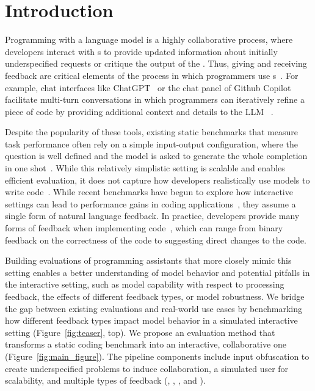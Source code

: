 

\section{Introduction}







Programming with a language model is a highly collaborative process, where developers interact with \cm s to provide updated information about initially underspecified requests or critique the output of the \cm.
Thus, giving and receiving feedback are critical elements of the process in which programmers use \cm{}s~\cite{chidambaram2024socratic}. 
For example, chat interfaces like ChatGPT~\citep{chatgpt} or the chat panel of Github Copilot~\cite{copilot} facilitate multi-turn conversations in which programmers can iteratively refine a piece of code by providing additional context and details to the LLM ~\citep{kalla2023study,xiao2023devgpt}.

Despite the popularity of these tools, existing static benchmarks that measure task performance often rely on a simple input-output configuration, where the question is well defined and the model is asked to generate the whole completion in one shot~\citep{chen2021evaluating,austin2021program,jain2024livecodebench, white2024livebench}.
While this relatively simplistic setting is scalable and enables efficient evaluation, it does not capture how developers realistically use models to write code~\citep{mozannar2024realhumaneval}. 
While recent benchmarks have begun to explore how interactive settings can lead to performance gains in coding applications~\cite{wang2023mint}, they assume a single form of natural language feedback. 
In practice, developers provide many forms of feedback when implementing code~\citep{chidambaram2024socratic}, which can range from binary feedback on the correctness of the code to suggesting direct changes to the code. 



Building evaluations of programming assistants that more closely mimic this setting enables a better understanding of model behavior and potential pitfalls in the interactive setting, such as model capability with respect to processing feedback, the effects of different feedback types, or model robustness. 
We bridge the gap between existing evaluations and real-world use cases by benchmarking how different feedback types impact model behavior in a simulated interactive setting (Figure~\ref{fig:teaser}, top). 
We propose an evaluation method that transforms a static coding benchmark into an interactive, collaborative one (Figure~\ref{fig:main_figure}). 
The pipeline components include input obfuscation to create underspecified problems to induce collaboration, a simulated user for scalability, and multiple types of feedback (\cf, \ir, \para, and \sent).




